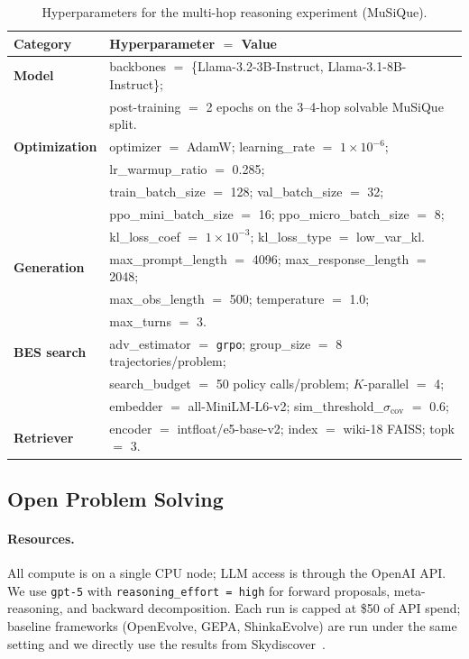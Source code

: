 \begin{table}[h]
\centering
\caption{Hyperparameters for the multi-hop reasoning experiment (MuSiQue).}
\label{tab:hyperparams_multihop}
\begin{tabularx}{\textwidth}{@{}lX@{}}
\toprule
\textbf{Category} & \textbf{Hyperparameter $=$ Value} \\
\midrule
\textbf{Model} &
backbones $=$ \{Llama-3.2-3B-Instruct, Llama-3.1-8B-Instruct\}; \\
& post-training $=$ 2 epochs on the 3--4-hop solvable MuSiQue split. \\
\midrule
\textbf{Optimization} &
optimizer $=$ AdamW; learning\_rate $=$ $1\!\times\!10^{-6}$; \\
& lr\_warmup\_ratio $=$ 0.285; \\
& train\_batch\_size $=$ 128; val\_batch\_size $=$ 32; \\
& ppo\_mini\_batch\_size $=$ 16; ppo\_micro\_batch\_size $=$ 8; \\
& kl\_loss\_coef $=$ $1\!\times\!10^{-3}$; kl\_loss\_type $=$ low\_var\_kl. \\
\midrule
\textbf{Generation} &
max\_prompt\_length $=$ 4096; max\_response\_length $=$ 2048; \\
& max\_obs\_length $=$ 500; temperature $=$ 1.0; \\
&max\_turns $=$ 3. \\
\midrule
\textbf{BES search} &
adv\_estimator $=$ \texttt{grpo}; group\_size $=$ 8 trajectories/problem; \\
& search\_budget $=$ 50 policy calls/problem; $K$-parallel $=$ 4; \\
& embedder $=$ all-MiniLM-L6-v2; sim\_threshold\_$\sigma_\mathrm{cov}$ $=$ 0.6; \\
\midrule
\textbf{Retriever} &
encoder $=$ intfloat/e5-base-v2; index $=$ wiki-18 FAISS; topk $=$ 3. \\
\bottomrule
\end{tabularx}
\end{table}


\subsection{Open Problem Solving}
\label{app:inference_setup}

\paragraph{Resources.}
All compute is on a single CPU node; LLM access is through the OpenAI
API. We use \texttt{gpt-5} with \texttt{reasoning\_effort = high} for
forward proposals, meta-reasoning, and backward decomposition. Each run
is capped at \$50 of API spend; baseline frameworks (OpenEvolve, GEPA,
ShinkaEvolve) are run under the same setting and we directly use the results from Skydiscover~\citep{skydiscover}.

